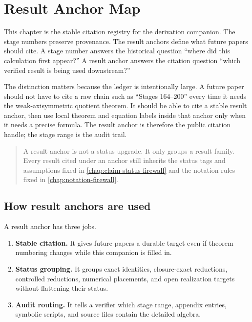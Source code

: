 \chapter{Result Anchor Map}
\label{chap:result-anchor-map}

This chapter is the stable citation registry for the derivation companion.  The stage numbers preserve provenance.  The result anchors define what future papers should cite.  A stage number answers the historical question ``where did this calculation first appear?''  A result anchor answers the citation question ``which verified result is being used downstream?''

The distinction matters because the ledger is intentionally large.  A future paper should not have to cite a raw chain such as ``Stages 164--200'' every time it needs the weak-axisymmetric quotient theorem.  It should be able to cite a stable result anchor, then use local theorem and equation labels inside that anchor only when it needs a precise formula.  The result anchor is therefore the public citation handle; the stage range is the audit trail.

\begin{quote}
A result anchor is not a status upgrade.  It only groups a result family.  Every result cited under an anchor still inherits the status tags and assumptions fixed in \cref{chap:claim-status-firewall} and the notation rules fixed in \cref{chap:notation-firewall}.
\end{quote}

\section{How result anchors are used}
\label{sec:anchor-use-rules}

A result anchor has three jobs.

\begin{enumerate}[leftmargin=2.2em]
  \item \textbf{Stable citation.}  It gives future papers a durable target even if theorem numbering changes while this companion is filled in.
  \item \textbf{Status grouping.}  It groups exact identities, closure-exact reductions, controlled reductions, numerical placements, and open realization targets without flattening their status.
  \item \textbf{Audit routing.}  It tells a verifier which stage range, appendix entries, symbolic scripts, and source files contain the detailed algebra.
\end{enumerate}

